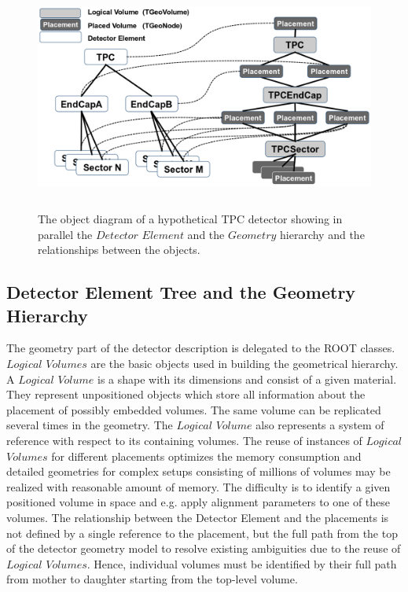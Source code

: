 \documentclass[10pt,a4paper]{article}
\begin{document}
\begin{figure}[h]
  \begin{center}
    \includegraphics[height=75mm] {DD4hep_detelement_tree.png}
    \caption{The object diagram of a hypothetical TPC detector showing in
    parallel the $Detector$ $Element$ and the $Geometry$ hierarchy and the 
    relationships between the objects.}
    \label{fig:dd4hep-hierarchies}
  \end{center}
  \vspace{-0.5cm}
\end{figure}
\subsection{Detector Element Tree and the Geometry Hierarchy}
\label{subsect:detelement-hierarchy}
\noindent
The geometry part of the detector description is delegated to the ROOT classes.
$Logical$ $Volumes$ are the basic objects used in building the geometrical hierarchy. 
A $Logical$ $Volume$ is a shape with its dimensions and consist of a given material. 
They represent unpositioned objects which store all information about 
the placement of possibly embedded volumes. The same
volume can be replicated several times in the geometry. The $Logical$ $Volume$ also 
represents a system of reference with respect to its containing volumes.
The reuse of instances of $Logical$ $Volumes$ for different placements 
optimizes the memory consumption and detailed geometries for complex setups
consisting of millions of volumes may be realized with reasonable amount of memory.
The difficulty is to identify a given positioned volume 
in space and e.g. apply alignment parameters to one of these volumes. 
The relationship between the Detector Element and the placements
is not defined by a single reference to the placement, but the full path 
from the top of the detector geometry model to resolve existing
ambiguities due to the reuse of $Logical$ $Volumes$.
Hence, individual volumes must be identified by their full path from mother 
to daughter starting from the top-level volume. 
\end{document}
